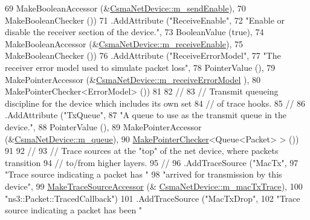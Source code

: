 \begin{DoxyCode}
69                    MakeBooleanAccessor (&\hyperlink{classns3_1_1CsmaNetDevice_ac5bde9af7f582a6d707a68061c114fdf}{CsmaNetDevice::m\_sendEnable}),
70                    MakeBooleanChecker ())
71     .AddAttribute (\textcolor{stringliteral}{"ReceiveEnable"},
72                    \textcolor{stringliteral}{"Enable or disable the receiver section of the device."},
73                    BooleanValue (\textcolor{keyword}{true}),
74                    MakeBooleanAccessor (&\hyperlink{classns3_1_1CsmaNetDevice_a8d844dcce78846a16c9a52c752f9736f}{CsmaNetDevice::m\_receiveEnable}),
75                    MakeBooleanChecker ())
76     .AddAttribute (\textcolor{stringliteral}{"ReceiveErrorModel"}, 
77                    \textcolor{stringliteral}{"The receiver error model used to simulate packet loss"},
78                    PointerValue (),
79                    MakePointerAccessor (&\hyperlink{classns3_1_1CsmaNetDevice_aeef9196f9c7c46c99a7f703dc46c0207}{CsmaNetDevice::m\_receiveErrorModel}
      ),
80                    MakePointerChecker<ErrorModel> ())
81 
82     \textcolor{comment}{//}
83     \textcolor{comment}{// Transmit queueing discipline for the device which includes its own set}
84     \textcolor{comment}{// of trace hooks.}
85     \textcolor{comment}{//}
86     .AddAttribute (\textcolor{stringliteral}{"TxQueue"}, 
87                    \textcolor{stringliteral}{"A queue to use as the transmit queue in the device."},
88                    PointerValue (),
89                    MakePointerAccessor (&\hyperlink{classns3_1_1CsmaNetDevice_a499be4029c01107f7f16f5371843ffde}{CsmaNetDevice::m\_queue}),
90                    \hyperlink{namespacens3_a8cd81c2f226bc23ad44a259717e6da15}{MakePointerChecker}<Queue<Packet> > ())
91 
92     \textcolor{comment}{//}
93     \textcolor{comment}{// Trace sources at the "top" of the net device, where packets transition}
94     \textcolor{comment}{// to/from higher layers.}
95     \textcolor{comment}{//}
96     .AddTraceSource (\textcolor{stringliteral}{"MacTx"}, 
97                      \textcolor{stringliteral}{"Trace source indicating a packet has "}
98                      \textcolor{stringliteral}{"arrived for transmission by this device"},
99                      \hyperlink{group__tracing_gab21a770b9855af4e8f69f7531ea4a6b0}{MakeTraceSourceAccessor} (&
      \hyperlink{classns3_1_1CsmaNetDevice_acd8f03ea3f02befd6caa2b07065ac80a}{CsmaNetDevice::m\_macTxTrace}),
100                      \textcolor{stringliteral}{"ns3::Packet::TracedCallback"})
101     .AddTraceSource (\textcolor{stringliteral}{"MacTxDrop"}, 
102                      \textcolor{stringliteral}{"Trace source indicating a packet has been "}

\end{DoxyCode}
